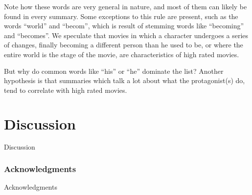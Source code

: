 \documentclass{article} %
\begin{document}
Note how these words are very general in nature, and most of them can likely be found in every summary. 
Some exceptions to this rule are present, such as the words ``world'' and ``becom'', which is result of stemming words like ``becoming'' and ``becomes''.
We speculate that movies in which a character undergoes a series of changes, finally becoming a different person than he used to be, or where the entire world is the stage of the movie, are characteristics of high rated movies.

But why do common words like ``his'' or ``he'' dominate the list? 
Another hypothesis is that summaries which talk a lot about what the protagonist(s) do, tend to correlate with high rated movies.

\section{Discussion}
\label{sec:discussion}

Discussion

\subsubsection*{Acknowledgments}

Acknowledgments
\end{document}
